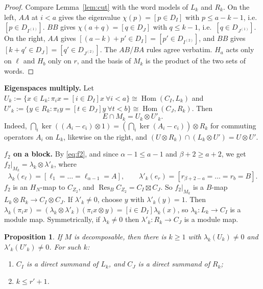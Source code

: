 \documentclass[11pt]{amsart}
\newcommand{\Hom}{\operatorname{Hom}}
\newcommand{\Res}{\operatorname{Res}}
\newcommand{\sq}{\boxtimes}
\theoremstyle{plain}
\newtheorem{proposition}[lemma]{Proposition}
\theoremstyle{definition}
\begin{document}
\begin{proof}
Compare Lemma~\ref{lem:cut} with the word models of $L_k$ and $R_k$. On the left, $AA$ at $i<a$ gives the eigenvalue $\chi(p)=[p\in D_I]$ with $p\le a-k-1$, i.e.\ $[p\in D_{I^{(1)}}]$. $BB$ gives $\chi(a+q)=[q\in D_J]$ with $q\le k-1$, i.e.\ $[q\in D_{J^{(1)}}]$. On the right, $AA$ gives $[(a-k)+p'\in D_I]=[p'\in D_{I^{(2)}}]$, and $BB$ gives $[k+q'\in D_J]=[q'\in D_{J^{(2)}}]$. The $AB$/$BA$ rules agree verbatim. $H_a$ acts only on $\ell$ and $H_b$ only on $r$, and the basis of $M_k$ is the product of the two sets of words.
\end{proof}

\noindent\textbf{Eigenspaces multiply.} Let $U_k:=\{x\in L_k:\pi_ix=[i\in D_I]x\ \forall i<a\}\cong\Hom(C_I,L_k)$ and $U'_k:=\{y\in R_k:\pi_ty=[t\in D_J]y\ \forall t<b\}\cong\Hom(C_J,R_k)$. Then
\[
E\cap M_k=U_k\otimes U'_k.
\]
Indeed, $\bigcap_i\ker((A_i-c_i)\otimes1)=(\bigcap_i\ker(A_i-c_i))\otimes R_k$ for commuting operators $A_i$ on $L_k$, likewise on the right, and $(U\otimes R_k)\cap(L_k\otimes U')=U\otimes U'$.

\noindent\textbf{$f_2$ on a block.} By \eqref{eq:f2}, and since $\alpha-1\le a-1$ and $\beta+2\ge a+2$, we get $f_2|_{M_k}=\lambda_k\otimes\lambda'_k$, where
\[
\lambda_k(e_\ell)=[\ell_1=\dots=\ell_{\alpha-1}=A],\qquad \lambda'_k(e_r)=[r_{\beta+2-a}=\dots=r_b=B].
\]
$f_2$ is an $H_N$-map to $C_{Z_2}$, and $\Res_BC_{Z_2}=C_I\sq C_J$. So $f_2|_{M_k}$ is a $B$-map $L_k\otimes R_k\to C_I\otimes C_J$. If $\lambda'_k\ne0$, choose $y$ with $\lambda'_k(y)=1$. Then $\lambda_k(\pi_ix)=(\lambda_k\otimes\lambda'_k)(\pi_ix\otimes y)=[i\in D_I]\lambda_k(x)$, so $\lambda_k:L_k\to C_I$ is a module map. Symmetrically, if $\lambda_k\ne0$ then $\lambda'_k:R_k\to C_J$ is a module map.

\begin{proposition}\label{prop:witness}
If $M$ is decomposable, then there is $k\ge1$ with $\lambda_k(U_k)\ne0$ and $\lambda'_k(U'_k)\ne0$. For such $k$:
\begin{enumerate}[label=\textup{(\alph*)},itemsep=1pt]
\item $C_I$ is a direct summand of $L_k$, and $C_J$ is a direct summand of $R_k$;
\item $k\le r'+1$.
\end{enumerate}
\end{proposition}
\end{document}
